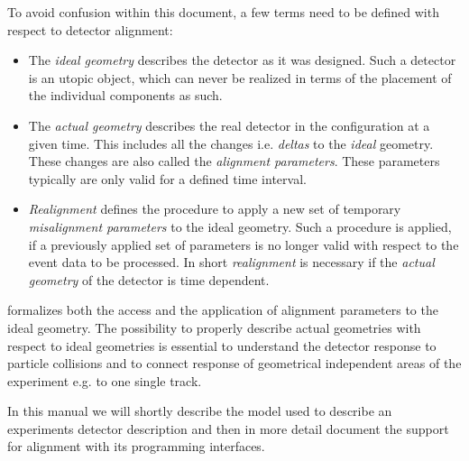 \documentclass[10pt,a4paper]{article}
\begin{document}
\noindent
To avoid confusion within this document, a few terms need to be defined
with respect to detector alignment:
\begin{itemize}\itemcompact
\item The {\it{ideal geometry}} describes the detector as it was designed.
    Such a detector is an utopic object, which can never be realized in terms
    of the placement of the individual components as such.
\item The {\it{actual geometry}} describes the real detector 
    in the configuration at
    a given time. This includes all the changes i.e. {\it{deltas}} to the 
    {\it{ideal}} geometry. These changes are also called the 
    {\it{alignment parameters}}. These parameters typically are only valid 
    for a defined time interval.
\item {\it{Realignment}} defines the procedure to apply a new set of
    temporary {\it{misalignment parameters}} to the ideal geometry. 
    Such a procedure
    is applied, if a previously applied set of parameters is no longer valid with
    respect to the event data to be processed. In short {\it{realignment}}
    is necessary if the {\it{actual geometry}} of the detector is time dependent.
\end{itemize}

\noindent
\DDA formalizes both the access and the application of alignment parameters 
to the ideal geometry. The possibility to properly describe actual geometries 
with respect to ideal geometries is essential to understand the detector response
to particle collisions and to connect response of geometrical independent
areas of the experiment e.g. to one single track.

\noindent
In this manual we will shortly describe the model used
to describe an experiments detector description and then in more detail 
document the support for alignment with its programming interfaces.
\end{document}
